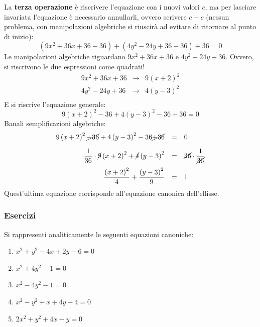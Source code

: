 \documentclass[a4paper]{article}
\begin{document}
	\noindent
	La \textbf{terza operazione} è riscrivere l'equazione con i nuovi valori $c$, ma per lasciare invariata l'equazione è necessario annullarli, ovvero scrivere $c-c$ (nessun problema, con manipolazioni algebriche si riuscirà ad evitare di ritornare al punto di inizio):
	\begin{equation*}
		\left(9x^{2} + 36x + 36 - 36\right) + \left(4y^{2} - 24y + 36 - 36\right) + 36 = 0
	\end{equation*}
	Le manipolazioni algebriche riguardano $9x^{2} + 36x + 36$ e $4y^{2} - 24y + 36$. Ovvero, si riscrivono le due espressioni come quadrati!
	\begin{equation*}
		\begin{array}{rcl}
			9x^{2} + 36x + 36 &\longrightarrow& 9\left(x+2\right)^{2} \\
			4y^{2} - 24y + 36 &\longrightarrow& 4\left(y-3\right)^{2} \\
		\end{array}
	\end{equation*}
	E si riscrive l'equazione generale:
	\begin{equation*}
		9\left(x+2\right)^{2} - 36 + 4\left(y-3\right)^{2} - 36 + 36 = 0
	\end{equation*}
	Banali semplificazioni algebriche:
	\begin{equation*}
		\begin{array}{rcl}
			9\left(x+2\right)^{2} \cancel{- 36} + 4\left(y-3\right)^{2} - 36 \cancel{+ 36} &=& 0 \\ [1em]
			\dfrac{1}{36} \cdot \cancel{9}\left(x+2\right)^{2} + \cancel{4}\left(y-3\right)^{2} &=& \cancel{36} \cdot \dfrac{1}{\cancel{36}}  \\ [1em]
			\dfrac{\left(x+2\right)^{2}}{4} + \dfrac{\left(y-3\right)^{2}}{9} &=& 1
		\end{array}
	\end{equation*}
	Quest'ultima equazione corrisponde all'equazione canonica dell'ellisse.\newpage

	\subsubsection{Esercizi}\label{subsubsection: esercizi (geometria analitica)}
	
	Si rappresenti analiticamente le seguenti equazioni canoniche:
	\begin{enumerate}
		\item $x^{2} + y^{2} - 4x + 2y - 6 = 0$
		
		\item $x^{2} + 4y^{2} - 1 = 0$
		
		\item $x^{2} - 4y^{2} - 1 = 0$
		
		\item $x^{2} - y^{2} + x + 4y - 4 = 0$
		
		\item $2x^{2} + y^{2} + 4x - y = 0$
	\end{enumerate}
	
\end{document}
